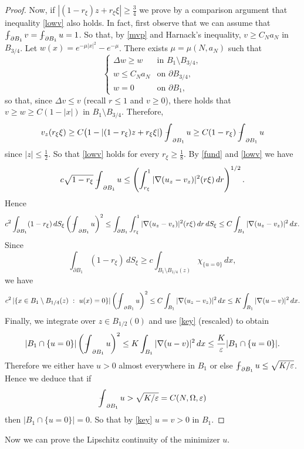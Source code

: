 \documentclass[11pt]{amsart}
\theoremstyle{definition}
\theoremstyle{remark}
\numberwithin{equation}{section}
\newcommand{\avint}{\mathop{\,\rlap{--}\!\!\int}\nolimits}
\begin{document}
\begin{proof}
Now, if $|(1-r_\xi)z+r_\xi\xi|\ge\frac34$ we prove by a comparison argument that inequality \eqref{lowv} also holds. In fact, first observe that we can assume that $\avint_{\partial B_1}v=\avint_{\partial B_1}u=1$. So that, by \eqref{mvp} and Harnack's inequality, $v\ge C_Na_N$ in $B_{3/4}$. Let $w(x)=e^{-\mu|x|^2}-e^{-\mu}$. There exists $\mu=\mu(N,a_N)$ such that
\[
\begin{cases}
\Delta w\ge w & \text{in } B_1\setminus B_{3/4},\\
w\le C_Na_N & \text{on }\partial B_{3/4},\\
w=0 & \text{on }\partial B_1,
\end{cases}
\]
so that, since $\Delta v\le v$ (recall $r\le1$ and $v\ge0$), there holds that $v\ge w\ge C(1-|x|)$ in $B_1\setminus B_{3/4}$. Therefore,
\[
v_z(r_\xi\xi)\ge C\big(1-|(1-r_\xi)z+r_\xi\xi|\big)\avint_{\partial B_1}u\ge C(1-r_\xi)\avint_{\partial B_1}u
\]
since $|z|\le\frac12$. So that \eqref{lowv} holds for every $r_\xi\ge\frac18$. By \eqref{fund} and \eqref{lowv} we have
\[
c\sqrt{1-r_\xi}\avint_{\partial B_1}u\le\left(\int_{r_\xi}^1|\nabla(u_z-v_z)|^2(r\xi)\,dr\right)^{1/2}.
\]
Hence
\[
c^2\int_{\partial B_1}(1-r_\xi)\,dS_\xi\left(\avint_{\partial B_1}u\right)^2\le\int_{\partial B_1}\int_{r_\xi}^1|\nabla(u_z-v_z)|^2(r\xi)\,dr\,dS_\xi\le C\int_{B_1}|\nabla(u_z-v_z)|^2\,dx.
\]
Since
\[
\int_{\partial B_1}(1-r_\xi)\,dS_\xi\ge c\int_{B_1\setminus B_{1/4}(z)}\chi_{\{u=0\}}\,dx,
\]
we have
\[
c^2\,|\{x\in B_1\setminus B_{1/4}(z)\ :\ u(x)=0\}|\left(\avint_{\partial B_1}u\right)^2\le C\int_{B_1}|\nabla(u_z-v_z)|^2\,dx\le K\int_{B_1}|\nabla(u-v)|^2\,dx.
\]
Finally, we integrate over $z\in B_{1/2}(0)$ and use \eqref{key} (rescaled) to obtain
\begin{equation}\label{29}
|B_1\cap\{u=0\}|\left(\avint_{\partial B_1}u\right)^2\le K\int_{B_1}|\nabla(u-v)|^2\,dx\le\frac K\varepsilon|B_1\cap\{u=0\}|.
\end{equation}
Therefore we either have $u>0$ almost everywhere in $B_1$ or else $\avint_{\partial B_1}u\le\sqrt{K/\varepsilon}$. Hence we deduce that if
\[
\avint_{\partial B_1}u>\sqrt{K/\varepsilon}=C(N,\Omega,\varepsilon)
\]
then $|B_1\cap\{u=0\}|=0$. So that by \eqref{key} $u=v>0$ in $B_1$.
\end{proof}

Now we can prove the Lipschitz continuity of the minimizer $u$.
\end{document}
